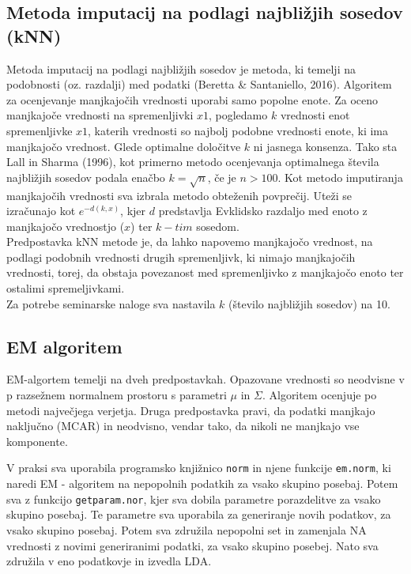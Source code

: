 \documentclass[12pt,a4paper]{article}
\begin{document}
\subsection{Metoda imputacij na podlagi najbližjih sosedov (kNN)}
Metoda imputacij na podlagi najbližjih sosedov je metoda, ki temelji na podobnosti (oz. razdalji) med podatki (Beretta \& Santaniello, 2016). Algoritem za ocenjevanje manjkajočih vrednosti uporabi samo popolne enote. Za oceno manjkajoče vrednosti na spremenljivki $x1$, pogledamo $k$ vrednosti enot spremenljivke $x1$, katerih vrednosti so najbolj podobne vrednosti enote, ki ima manjkajočo vrednost. Glede optimalne določitve $k$ ni jasnega konsenza. Tako sta Lall in Sharma (1996), kot primerno metodo ocenjevanja optimalnega števila najbližjih sosedov podala enačbo $k = \sqrt{n}$, če je $n > 100$. Kot metodo imputiranja manjkajočih vrednosti sva izbrala metodo obteženih povprečij. Uteži se izračunajo kot $e^{-d(k,x)}$, kjer $d$ predstavlja Evklidsko razdaljo med enoto z manjkajočo vrednostjo ($x$) ter $k-tim$ sosedom.\\
Predpostavka kNN metode je, da lahko napovemo manjkajočo vrednost, na podlagi podobnih vrednosti drugih spremenljivk, ki nimajo manjkajočih vrednosti, torej, da obstaja povezanost med spremenljivko z manjkajočo enoto ter ostalimi spremeljivkami.\\
Za potrebe seminarske naloge sva nastavila $k$ (število najbližjih sosedov) na 10.\\

\subsection{EM algoritem}

EM-algortem temelji na dveh predpostavkah. Opazovane vrednosti so neodvisne v p razsežnem normalnem prostoru s parametri $\mu$ in $\Sigma$. Algoritem ocenjuje po metodi največjega verjetja. Druga predpostavka pravi, da podatki manjkajo naključno (MCAR) in neodvisno, vendar tako, da nikoli ne manjkajo vse komponente.

V praksi sva uporabila programsko knjižnico \verb|norm| in njene funkcije \verb|em.norm|, ki naredi EM - algoritem na nepopolnih podatkih za vsako skupino posebaj. Potem sva z funkcijo \verb|getparam.nor|, kjer sva dobila parametre porazdelitve za vsako skupino posebaj. Te parametre sva uporabila za generiranje novih podatkov, za vsako skupino posebaj. Potem sva združila nepopolni set in zamenjala NA vrednosti z novimi generiranimi podatki, za vsako skupino posebej. Nato sva združila v eno podatkovje in izvedla LDA.
\end{document}
